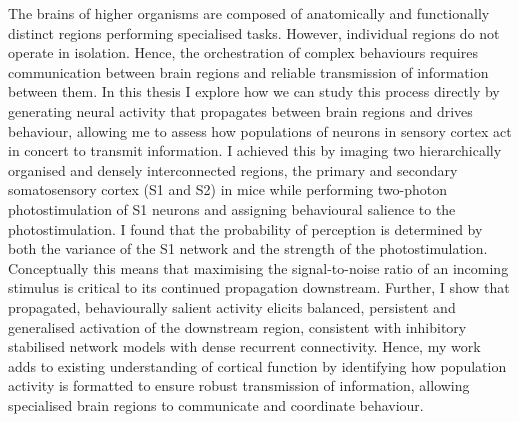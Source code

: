 The brains of higher organisms are composed of anatomically and functionally distinct regions performing specialised tasks. However, individual regions do not operate in isolation. Hence, the orchestration of complex behaviours requires communication between brain regions and reliable transmission of information between them. In this thesis I explore how we can study this process directly by generating neural activity that propagates between brain regions and drives behaviour, allowing me to assess how populations of neurons in sensory cortex act in concert to transmit information. I achieved this by imaging two hierarchically organised and densely interconnected regions, the primary and secondary somatosensory cortex (S1 and S2) in mice while performing two-photon photostimulation of S1 neurons and assigning behavioural salience to the photostimulation. I found that the probability of perception is determined by both the variance of the S1 network and the strength of the photostimulation. Conceptually this means that maximising the signal-to-noise ratio of an incoming stimulus is critical to its continued propagation downstream. Further, I show that propagated, behaviourally salient activity elicits balanced, persistent and generalised activation of the downstream region, consistent with inhibitory stabilised network models with dense recurrent connectivity. Hence, my work adds to existing understanding of cortical function by identifying how population activity is formatted to ensure robust transmission of information, allowing specialised brain regions to communicate and coordinate behaviour.